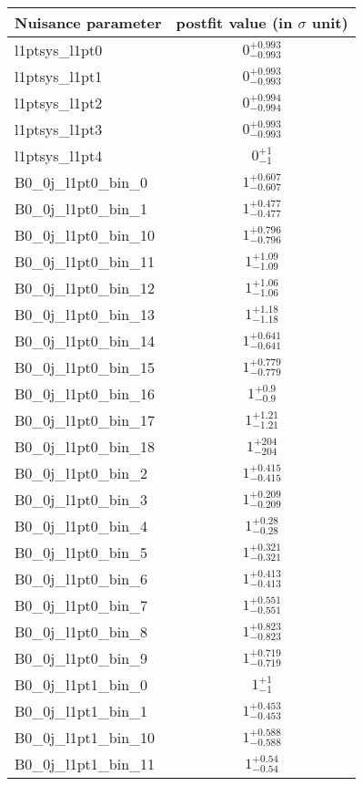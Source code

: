 
\begin{tabular}{|l|c|}
\hline
Nuisance parameter & postfit value (in $\sigma$ unit) \\\hline
l1ptsys\_l1pt0 & $0^{+0.993}_{-0.993}$ \\
l1ptsys\_l1pt1 & $0^{+0.993}_{-0.993}$ \\
l1ptsys\_l1pt2 & $0^{+0.994}_{-0.994}$ \\
l1ptsys\_l1pt3 & $0^{+0.993}_{-0.993}$ \\
l1ptsys\_l1pt4 & $0^{+1}_{-1}$ \\
B0\_0j\_l1pt0\_bin\_0 & $1^{+0.607}_{-0.607}$ \\
B0\_0j\_l1pt0\_bin\_1 & $1^{+0.477}_{-0.477}$ \\
B0\_0j\_l1pt0\_bin\_10 & $1^{+0.796}_{-0.796}$ \\
B0\_0j\_l1pt0\_bin\_11 & $1^{+1.09}_{-1.09}$ \\
B0\_0j\_l1pt0\_bin\_12 & $1^{+1.06}_{-1.06}$ \\
B0\_0j\_l1pt0\_bin\_13 & $1^{+1.18}_{-1.18}$ \\
B0\_0j\_l1pt0\_bin\_14 & $1^{+0.641}_{-0.641}$ \\
B0\_0j\_l1pt0\_bin\_15 & $1^{+0.779}_{-0.779}$ \\
B0\_0j\_l1pt0\_bin\_16 & $1^{+0.9}_{-0.9}$ \\
B0\_0j\_l1pt0\_bin\_17 & $1^{+1.21}_{-1.21}$ \\
B0\_0j\_l1pt0\_bin\_18 & $1^{+204}_{-204}$ \\
B0\_0j\_l1pt0\_bin\_2 & $1^{+0.415}_{-0.415}$ \\
B0\_0j\_l1pt0\_bin\_3 & $1^{+0.209}_{-0.209}$ \\
B0\_0j\_l1pt0\_bin\_4 & $1^{+0.28}_{-0.28}$ \\
B0\_0j\_l1pt0\_bin\_5 & $1^{+0.321}_{-0.321}$ \\
B0\_0j\_l1pt0\_bin\_6 & $1^{+0.413}_{-0.413}$ \\
B0\_0j\_l1pt0\_bin\_7 & $1^{+0.551}_{-0.551}$ \\
B0\_0j\_l1pt0\_bin\_8 & $1^{+0.823}_{-0.823}$ \\
B0\_0j\_l1pt0\_bin\_9 & $1^{+0.719}_{-0.719}$ \\
B0\_0j\_l1pt1\_bin\_0 & $1^{+1}_{-1}$ \\
B0\_0j\_l1pt1\_bin\_1 & $1^{+0.453}_{-0.453}$ \\
B0\_0j\_l1pt1\_bin\_10 & $1^{+0.588}_{-0.588}$ \\
B0\_0j\_l1pt1\_bin\_11 & $1^{+0.54}_{-0.54}$ \\

\end{tabular}
